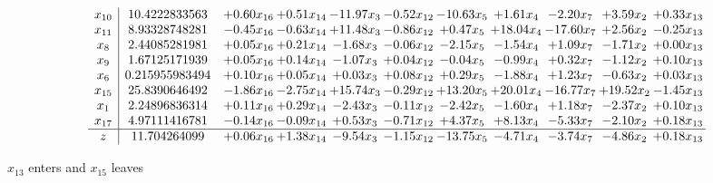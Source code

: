 \documentclass[9pt]{article}
\begin{document}
 \[\begin{array}{c| c c@{\hskip 2pt} c@{\hskip 2pt} c@{\hskip 2pt} c@{\hskip 2pt} c@{\hskip 2pt} c@{\hskip 2pt} c@{\hskip 2pt} c@{\hskip 2pt} c@{\hskip 2pt} }
 x_{10}   &  10.4222833563 & +  0.60 x_{16} & +  0.51 x_{14} & -11.97 x_{3} & -0.52 x_{12} & -10.63 x_{5} & +  1.61 x_{4} & -2.20 x_{7} & +  3.59 x_{2} & +  0.33 x_{13}\\
 x_{11}   &  8.93328748281 & -0.45 x_{16} & -0.63 x_{14} & + 11.48 x_{3} & -0.86 x_{12} & +  0.47 x_{5} & + 18.04 x_{4} & -17.60 x_{7} & +  2.56 x_{2} & -0.25 x_{13}\\
 x_{8}   &  2.44085281981 & +  0.05 x_{16} & +  0.21 x_{14} & -1.68 x_{3} & -0.06 x_{12} & -2.15 x_{5} & -1.54 x_{4} & +  1.09 x_{7} & -1.71 x_{2} & +  0.00 x_{13}\\
 x_{9}   &  1.67125171939 & +  0.05 x_{16} & +  0.14 x_{14} & -1.07 x_{3} & +  0.04 x_{12} & -0.04 x_{5} & -0.99 x_{4} & +  0.32 x_{7} & -1.12 x_{2} & +  0.10 x_{13}\\
 x_{6}   &  0.215955983494 & +  0.10 x_{16} & +  0.05 x_{14} & +  0.03 x_{3} & +  0.08 x_{12} & +  0.29 x_{5} & -1.88 x_{4} & +  1.23 x_{7} & -0.63 x_{2} & +  0.03 x_{13}\\
 x_{15}   &  25.8390646492 & -1.86 x_{16} & -2.75 x_{14} & + 15.74 x_{3} & -0.29 x_{12} & + 13.20 x_{5} & + 20.01 x_{4} & -16.77 x_{7} & + 19.52 x_{2} & -1.45 x_{13}\\
 x_{1}   &  2.24896836314 & +  0.11 x_{16} & +  0.29 x_{14} & -2.43 x_{3} & -0.11 x_{12} & -2.42 x_{5} & -1.60 x_{4} & +  1.18 x_{7} & -2.37 x_{2} & +  0.10 x_{13}\\
 x_{17}   &  4.97111416781 & -0.14 x_{16} & -0.09 x_{14} & +  0.53 x_{3} & -0.71 x_{12} & +  4.37 x_{5} & +  8.13 x_{4} & -5.33 x_{7} & -2.10 x_{2} & +  0.18 x_{13}\\
\hline
z    &  11.704264099 & +  0.06 x_{16} & +  1.38 x_{14} & -9.54 x_{3} & -1.15 x_{12} & -13.75 x_{5} & -4.71 x_{4} & -3.74 x_{7} & -4.86 x_{2} & +  0.18 x_{13}\\
\end{array}\]


 $ x_{13} $ enters and $ x_{15} $ leaves 
\end{document}
